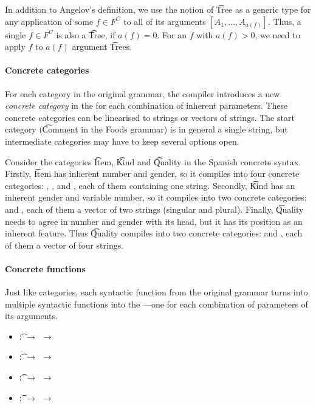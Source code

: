 In addition to Angelov's definition, we use the notion of \t{Tree} as a generic type for any application of some $f \in F^C$ to all of its arguments $[A_1, \dots, A_{a(f)}]$. Thus, a single $f \in F^C$ is also a \t{Tree}, if $a(f) = 0$. For an $f$ with $a(f) > 0$, we need to apply $f$ to $a(f)$ argument \t{Tree}s.


\paragraph{Concrete categories}

For each category in the original grammar, the \gf{} compiler
introduces a new \emph{concrete category} in the \pmcfg{} for each combination of
inherent parameters.  
These concrete categories can be linearised to strings or vectors of
strings. The start category (\t{Comment} in the Foods grammar) is in
general a single string, but intermediate categories may have to keep
several options open. 

Consider the categories \t{Item}, \t{Kind} and \t{Quality} in the
Spanish concrete syntax. Firstly, \t{Item} has inherent number
and gender, so it compiles into four concrete categories:
, ,  and
, each of them containing one string. Secondly,
\t{Kind} has an inherent gender and variable number, so it compiles into
two concrete categories:  and , each of them a
vector of two strings (singular and plural). Finally, \t{Quality} needs to
agree in number and gender with its head, but it has its position as
an inherent feature.  Thus \t{Quality} compiles into two concrete
categories:  and , each of them a vector of
four strings.

\paragraph{Concrete functions}
Just like categories, each syntactic function from the original
grammar turns into multiple syntactic functions into the
\pmcfg{}---one for each combination of parameters of its arguments.

\begin{itemize}
\setlength\itemsep{0em}
\item {} \t{:}  $\rightarrow$  $\rightarrow$ 
\item  {} \t{:}  $\rightarrow$  $\rightarrow$ 
\item  {}\t{:}  $\rightarrow$  $\rightarrow$ 
\item {} \t{:}  $\rightarrow$  $\rightarrow$ 
\end{itemize}


